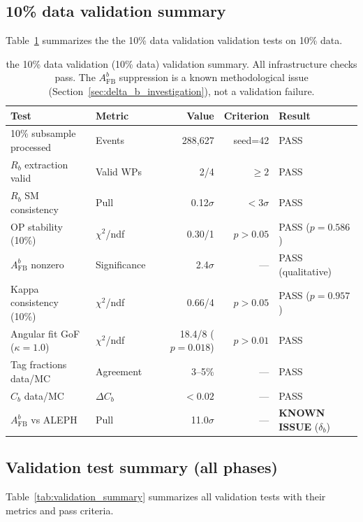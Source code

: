 \documentclass[11pt,a4paper]{article}
\begin{document}
\subsection{10\% data validation summary}
\label{sec:xcheck_10pct_summary}

Table~\ref{tab:validation_10pct} summarizes the the 10\% data validation validation tests on 10\% data.

\begin{table}[htbp]
\centering
\caption{the 10\% data validation (10\% data) validation summary. All infrastructure checks pass.
The $A_\mathrm{FB}^b$ suppression is a known methodological issue
(Section~\ref{sec:delta_b_investigation}), not a validation failure.}
\label{tab:validation_10pct}
\small
\begin{tabular}{llrrl}
\toprule
Test & Metric & Value & Criterion & Result \\
\midrule
10\% subsample processed & Events & 288,627 & seed=42 & PASS \\
$R_b$ extraction valid & Valid WPs & 2/4 & $\geq 2$ & PASS \\
$R_b$ SM consistency & Pull & 0.12$\sigma$ & $< 3\sigma$ & PASS \\
OP stability (10\%) & $\chi^2$/ndf & 0.30/1 & $p > 0.05$ & PASS ($p = 0.586$) \\
$A_\mathrm{FB}^b$ nonzero & Significance & 2.4$\sigma$ & --- & PASS (qualitative) \\
Kappa consistency (10\%) & $\chi^2$/ndf & 0.66/4 & $p > 0.05$ & PASS ($p = 0.957$) \\
Angular fit GoF ($\kappa=1.0$) & $\chi^2$/ndf & 18.4/8 ($p = 0.018$) & $p > 0.01$ & PASS \\
Tag fractions data/MC & Agreement & 3--5\% & --- & PASS \\
$C_b$ data/MC & $\Delta C_b$ & $< 0.02$ & --- & PASS \\
$A_\mathrm{FB}^b$ vs ALEPH & Pull & 11.0$\sigma$ & --- & \textbf{KNOWN ISSUE} ($\delta_b$) \\
\bottomrule
\end{tabular}
\end{table}

\subsection{Validation test summary (all phases)}
\label{sec:validation_summary}

Table~\ref{tab:validation_summary} summarizes all validation tests with their metrics
and pass criteria.
\end{document}
